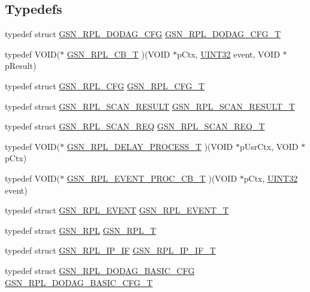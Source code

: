 \subsection*{Typedefs}
\begin{DoxyCompactItemize}
\item 
typedef struct \hyperlink{a00199}{GSN\_\-RPL\_\-DODAG\_\-CFG} \hyperlink{a00579_a64e20c2e6a33dd3586f70b9996040d27}{GSN\_\-RPL\_\-DODAG\_\-CFG\_\-T}
\item 
typedef VOID($\ast$ \hyperlink{a00579_aed305ee504daf71b35d8db4dfd6d3de3}{GSN\_\-RPL\_\-CB\_\-T} )(VOID $\ast$pCtx, \hyperlink{a00660_gae1e6edbbc26d6fbc71a90190d0266018}{UINT32} event, VOID $\ast$pResult)
\item 
typedef struct \hyperlink{a00197}{GSN\_\-RPL\_\-CFG} \hyperlink{a00579_a5363c16d8a8bbc0dd0ec573805d09841}{GSN\_\-RPL\_\-CFG\_\-T}
\item 
typedef struct \hyperlink{a00210}{GSN\_\-RPL\_\-SCAN\_\-RESULT} \hyperlink{a00579_aabd8c14f063f4c7f36a451081ef059b0}{GSN\_\-RPL\_\-SCAN\_\-RESULT\_\-T}
\item 
typedef struct \hyperlink{a00209}{GSN\_\-RPL\_\-SCAN\_\-REQ} \hyperlink{a00579_a95586790f6998cec77fd04b5565c3d21}{GSN\_\-RPL\_\-SCAN\_\-REQ\_\-T}
\item 
typedef VOID($\ast$ \hyperlink{a00579_af0ccdfb14b5152fb661e14482e16d4e7}{GSN\_\-RPL\_\-DELAY\_\-PROCESS\_\-T} )(VOID $\ast$pUsrCtx, VOID $\ast$pCtx)
\item 
typedef VOID($\ast$ \hyperlink{a00579_ad5cea0d221a0fad0b30b4a9e075a12ed}{GSN\_\-RPL\_\-EVENT\_\-PROC\_\-CB\_\-T} )(VOID $\ast$pCtx, \hyperlink{a00660_gae1e6edbbc26d6fbc71a90190d0266018}{UINT32} event)
\item 
typedef struct \hyperlink{a00200}{GSN\_\-RPL\_\-EVENT} \hyperlink{a00579_a3828181222414a7be42c9c7379651d15}{GSN\_\-RPL\_\-EVENT\_\-T}
\item 
typedef struct \hyperlink{a00192}{GSN\_\-RPL} \hyperlink{a00579_a220cddfa9f0fb98088268693eccbcb28}{GSN\_\-RPL\_\-T}
\item 
typedef struct \hyperlink{a00203}{GSN\_\-RPL\_\-IP\_\-IF} \hyperlink{a00579_abff4d48cd844df33ee6332ef011ac7ae}{GSN\_\-RPL\_\-IP\_\-IF\_\-T}
\item 
typedef struct \hyperlink{a00198}{GSN\_\-RPL\_\-DODAG\_\-BASIC\_\-CFG} \hyperlink{a00579_a71848a0de1043102d9f7e8054a42d56b}{GSN\_\-RPL\_\-DODAG\_\-BASIC\_\-CFG\_\-T}
\end{DoxyCompactItemize}
